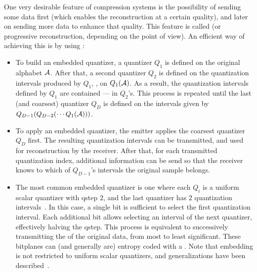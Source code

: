 One very desirable feature of compression systems is the possibility of sending some
data first (which enables the reconstruction at a certain quality),
and later on sending more data to enhance that quality. This feature is called
 (or progressive reconstruction, depending on the point of view).
%
An efficient way of achieving this is by using :
\begin{itemize}
\item To build an embedded quantizer, a quantizer $Q_1$ is defined on the original alphabet $\mathcal{A}$.
After that, a second quantizer $Q_2$ is defined on the quantization intervals
produced by $Q_1$, \ie, on $Q_1(\mathcal{A})$. As a result, the quantization intervals
defined by $Q_1$ are contained \mbox{----}
in $Q_2$'s. This process is repeated until the last (and coarsest) quantizer $Q_D$
is defined on the intervals given by $Q_{D-1}(Q_{D-2}(\cdots Q_1(\mathcal{A})))$.
\vspace{0.1cm}

\item To apply an embedded quantizer, the emitter applies the coarsest quantizer $Q_D$ first.
The resulting quantization intervals can be transmitted, and used for reconstruction
by the receiver. After that, for each transmitted quantization index, additional information
can be send so that the receiver knows to which of $Q_{D-1}$'s intervals the original
sample belongs.
\vspace{0.1cm}

\item The most common embedded quantizer is one where each $Q_i$ is a uniform scalar
quantizer with qstep $2$, and the last quantizer has $2$ quantization intervals~\cite[\S 3.2.6]{taubman2002jpeg2000}.
In this case, a single bit is sufficient to select the first quantization interval.
Each additional bit allows selecting an interval of the next quantizer, effectively
halving the qstep. This process is equivalent to successively transmitting the
 of the original data, from most to least significant.
%
These bitplanes can (and generally are) entropy coded with a .
%
Note that embedding is not restricted to uniform scalar quantizers,
and generalizations have been described~\cite{auli_geq}.
\end{itemize}

